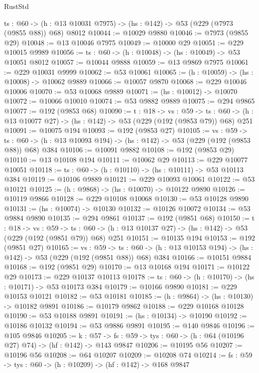 \begin{lexlean}{RustStd}
\begin{coremodule}
  {ts : @60} -> (h : @13 @10031 @7975) -> (hs : @142) -> @53 (@229 (@7973 (@9855 @88)) @68) @8012
@10044 := @10029 @9880
@10046 := @7973 (@9855 @29)
@10048 := @13 @10046 @7975
@10049 := @10000 @29
@10051 := @229 @10015 @9989
@10056 := {ts : @60} -> (h : @10048) -> (hs : @10049) -> @53 @10051 @8012
@10057 := @10044 @9888
@10059 := @13 @9869 @7975
@10061 := @229 @10031 @9999
@10062 := @53 @10061
@10065 := (h : @10059) -> (hs : @10008) -> @10062 @9889
@10066 := @10057 @9870
@10068 := @229 @10046 @10006
@10070 := @53 @10068 @9889
@10071 := (hs : @10012) -> @10070
@10072 := @10066 @10010
@10074 := @53 @9882 @9889
@10075 := @294 @9865
@10077 := @192 (@9853 @68)
@10090 := {t : @18} ->
  {vs : @59} ->
  {ts : @60} -> (h : @13 @10077 @27) -> (hs : @142) -> @53 (@229 (@192 (@9853 @79)) @68) @251
@10091 := @10075 @194
@10093 := @192 (@9853 @27)
@10105 := {vs : @59} ->
  {ts : @60} -> (h : @13 @10093 @194) -> (hs : @142) -> @53 (@229 (@192 (@9853 @88)) @68) @384
@10106 := @10091 @9882
@10108 := @192 (@9853 @29)
@10110 := @13 @10108 @194
@10111 := @10062 @29
@10113 := @229 @10077 @10051
@10118 := {ts : @60} -> (h : @10110) -> (hs : @10111) -> @53 @10113 @384
@10119 := @10106 @9889
@10121 := @229 @10093 @10061
@10122 := @53 @10121
@10125 := (h : @9868) -> (hs : @10070) -> @10122 @9890
@10126 := @10119 @9866
@10128 := @229 @10108 @10068
@10130 := @53 @10128 @9890
@10131 := (hs : @10074) -> @10130
@10132 := @10126 @10072
@10134 := @53 @9884 @9890
@10135 := @294 @9861
@10137 := @192 (@9851 @68)
@10150 := {t : @18} ->
  {vs : @59} ->
  {ts : @60} -> (h : @13 @10137 @27) -> (hs : @142) -> @53 (@229 (@192 (@9851 @79)) @68) @251
@10151 := @10135 @194
@10153 := @192 (@9851 @27)
@10165 := {vs : @59} ->
  {ts : @60} -> (h : @13 @10153 @194) -> (hs : @142) -> @53 (@229 (@192 (@9851 @88)) @68) @384
@10166 := @10151 @9884
@10168 := @192 (@9851 @29)
@10170 := @13 @10168 @194
@10171 := @10122 @29
@10173 := @229 @10137 @10113
@10178 := {ts : @60} -> (h : @10170) -> (hs : @10171) -> @53 @10173 @384
@10179 := @10166 @9890
@10181 := @229 @10153 @10121
@10182 := @53 @10181
@10185 := (h : @9864) -> (hs : @10130) -> @10182 @9891
@10186 := @10179 @9862
@10188 := @229 @10168 @10128
@10190 := @53 @10188 @9891
@10191 := (hs : @10134) -> @10190
@10192 := @10186 @10132
@10194 := @53 @9886 @9891
@10195 := @140 @9846
@10196 := @105 @9846
@10205 := {k : @57} ->
  {fs : @59} -> {tys : @60} -> (h : @64 (@10196 @27) @74) -> (hf : @142) -> @143 @9847
@10206 := @10195 @56
@10207 := @10196 @56
@10208 := @64 @10207
@10209 := @10208 @74
@10214 := {fs : @59} -> {tys : @60} -> (h : @10209) -> (hf : @142) -> @168 @9847

\end{coremodule}
\end{lexlean}
